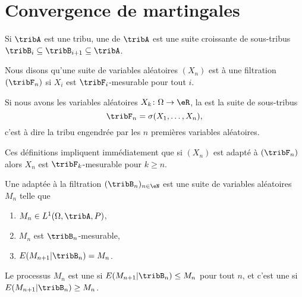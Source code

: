
\section{Convergence de martingales}

\begin{definition}
	Si \( \tribA\) est une tribu, une  de \( \tribA\) est une suite croissante de sous-tribus \( \tribB_i\subseteq\tribB_{i+1}\subseteq\tribA\).

	Nous disons qu'une suite de variables aléatoires \( (X_n)\) est  à une filtration \( (\tribF_n)\) si \( X_i\) est \( \tribF_i\)-mesurable pour tout \( i\).
\end{definition}

\begin{definition}	\label{DEFooUNRAooOEmCsh}
	Si nous avons les variables aléatoires \(X_k \colon \Omega\to \eR  \), la  est la suite de sous-tribus
	\begin{equation}
		\tribF_n=\sigma(X_1,\ldots,X_n),
	\end{equation}
	c'est à dire la tribu engendrée par les \( n\) premières variables aléatoires.
\end{definition}


Ces définitions impliquent immédiatement que si \( (X_n)\) est adapté à \( (\tribF_n)\) alors \( X_n\) est \( \tribF_k\)-mesurable pour \( k\geq n\).

\begin{definition}
	Une  adaptée à la filtration \( (\tribB_n)_{n\in \eN}\) est une suite de variables aléatoires \( M_n\) telle que
	\begin{enumerate}
		\item
		      \(M_n\in L^1(\Omega,\tribA,P)\),
		\item
		      \( M_n\) est \( \tribB_n\)-mesurable,
		\item
		      \( E(M_{n+1}|\tribB_n)=M_n\).
	\end{enumerate}

	Le processus \( M_n\) est une  si \( E(M_{n+1}|\tribB_n)\leq M_n\) pour tout \( n\), et c'est une  si \( E(M_{n+1}|\tribB_n)\geq M_n\).
\end{definition}

